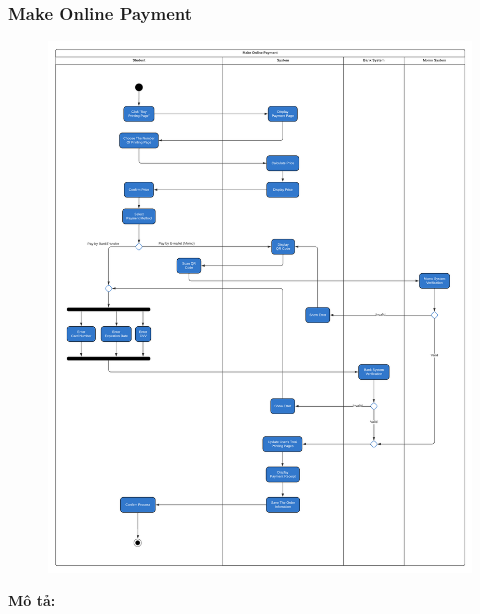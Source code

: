     \subsubsection{Make Online Payment}
   \begin{center}
    \begin{figure}[!htp]
    \begin{center}
     \includegraphics[scale=.4]{images/Task2/ActivityDiagrams/Payment.pdf}
    \end{center}
    \label{refhinh1}
    \end{figure}
    \end{center}
    \newpage
    \textbf{Mô tả:}
